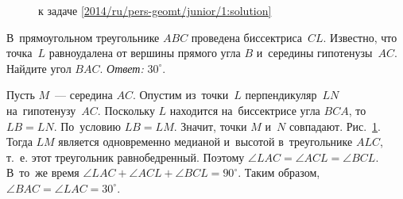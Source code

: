 \ifsolution
\begin{figure}\centering
    \caption{к задаче \ref{2014/ru/pers-geomt/junior/1:solution}}
    \label{2014/ru/pers-geomt/junior/1:solution:fig}
\end{figure}%
\fi %

\problem
В~прямоугольном треугольнике $ABC$ проведена биссектриса~$CL$.
Известно, что точка~$L$ равноудалена от вершины прямого угла $B$ и~середины
гипотенузы~$AC$.
Найдите угол $BAC$.
\solution
\label{2014/ru/pers-geomt/junior/1:solution}%
\emph{Ответ:} $30^\circ$.
\par
Пусть $M$~--- середина $AC$.
Опустим из~точки~$L$ перпендикуляр~$LN$ на~гипотенузу~$AC$.
Поскольку $L$ находится на~биссектрисе угла $BCA$, то $LB = LN$.
По~условию $LB = LM$.
Значит, точки $M$ и~$N$ совпадают.
Рис.~\ref{2014/ru/pers-geomt/junior/1:solution:fig}.
Тогда $LM$ является одновременно медианой и~высотой в~треугольнике $ALC$, т.~е.
этот треугольник равнобедренный.
Поэтому $\angle LAC = \angle ACL = \angle BCL$.
В~то~же время $\angle LAC + \angle ACL + \angle BCL = 90^{\circ}$.
Таким образом, $\angle BAC = \angle LAC = 30^{\circ}$.
\endproblem
